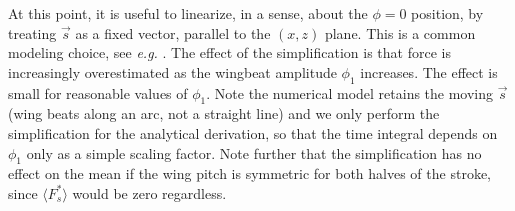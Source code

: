 \documentclass[11pt,letterpaper]{article}
\begin{document}
At this point, it is useful to linearize, in a sense, about the $\phi = 0$
position, by treating $\vec{s}$ as a fixed vector, parallel to the $(x,z)$
plane. This is a common modeling choice, see \emph{e.g.} \cite{wetherbee2026}.
The effect of the simplification is that force is increasingly
overestimated as the wingbeat amplitude $\phi_1$ increases. The effect is
small for reasonable values of $\phi_1$.
Note the numerical model retains the moving $\vec{s}$ (wing beats along an arc,
not a straight line) and we only perform the simplification for the analytical
derivation, so that the time integral depends on $\phi_1$ only as a
simple scaling factor. Note further that the simplification
has no effect on the mean if the wing pitch is symmetric
for both halves of the stroke, since $\langle F_s^* \rangle$ would be zero regardless.
\end{document}
